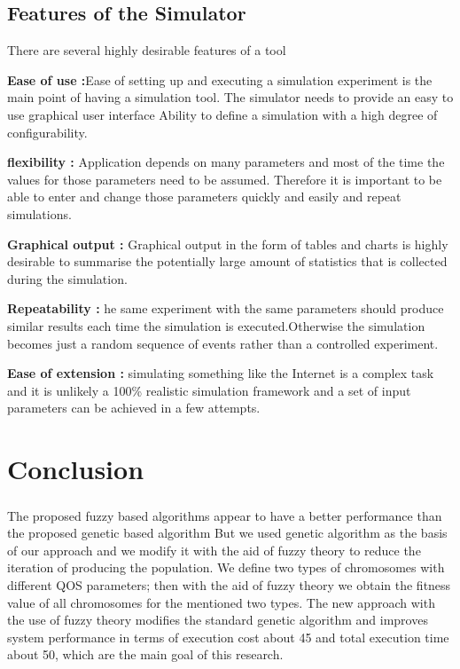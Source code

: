 \documentclass[a4paper,12pt]{report}
\begin{document}
{{{{{{{{			 
				 	\section{ Features of the Simulator}
		\par There are several highly desirable features of a tool
		
		\item \textbf{Ease of use :}Ease of setting up and executing a simulation experiment is the main point of having a simulation tool. The simulator needs to provide an easy to use graphical user interface 
		Ability to define a simulation with a high degree of configurability.
\item \textbf{flexibility :}
		Application depends on many parameters and most of the time the values for those parameters need to be assumed. Therefore it is important to be able to enter and change those parameters quickly and easily and repeat simulations.
		\item \textbf{Graphical output :}
		Graphical output in the form of tables and charts is highly desirable to summarise the potentially large amount of statistics that is collected during the simulation.
		\item \textbf{Repeatability :}
		he same experiment with the same parameters should produce similar results each time the simulation is executed.Otherwise the simulation becomes just a random sequence of events rather than a controlled experiment.
		\item \textbf{Ease of extension :}
		simulating something like the Internet is a complex task and it is unlikely a 100\% realistic simulation framework and a set of input parameters can be achieved in a few attempts.
		
		\chapter{Conclusion}
		\paragraph{}
		{
			\linespread{1.5}
			The proposed fuzzy based algorithms appear
			to have a better performance than the proposed genetic
			based algorithm
			But we used genetic algorithm as the basis of our approach and we modify it
			with the aid of fuzzy theory to reduce the iteration of producing the population. We
			define two types of chromosomes with different QOS parameters; then with the aid of fuzzy theory we obtain the fitness value of all chromosomes for the mentioned two
			types. The new approach with the use of fuzzy theory modifies the standard genetic
			algorithm and improves system performance in terms of execution cost about 45 and
		total execution time about 50, which are the main goal of this research.
	
}}}}}}}}}
\end{document}
